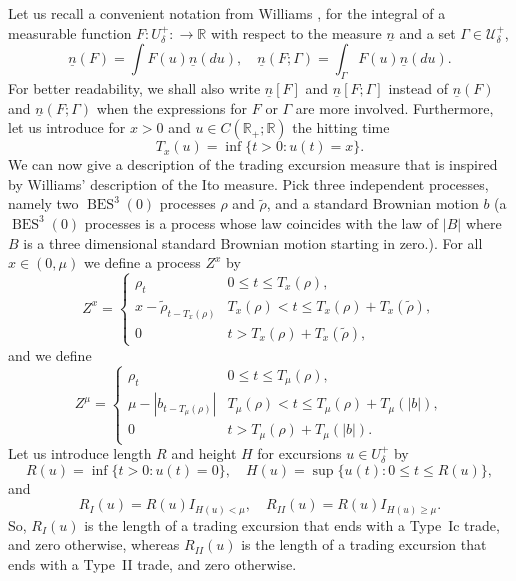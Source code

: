 \documentclass[11pt]{scrartcl}
\DeclareMathOperator{\BES}{BES}
\begin{document}
Let us recall a convenient notation from Williams \cite[Sec.5.0, p.49]{PWM},
for the integral of a measurable function $F:U_\delta^+:\to\mathbb R$ with respect to the
measure $\underline{n}$ and a set $\Gamma\in\mathcal{U}_\delta^+$, 
\begin{equation}
\underline{n}(F)=\int F(u)\underline{n}(du),\quad \underline{n}(F;\Gamma)=\int_\Gamma F(u)\underline{n}(du).
\end{equation}
For better readability, we shall also write $\underline{n}[F]$ and $\underline{n}[F;\Gamma]$ instead of $\underline{n}(F)$ and $\underline{n}(F;\Gamma)$ when the expressions for $F$ or $\Gamma$ are more involved.
Furthermore, let us introduce for $x>0$ and $u\in C(\mathbb{R}_+;\mathbb{R})$
the hitting time 
\begin{equation}
T_x(u)=\inf\{t>0:u(t)=x\}.
\end{equation}
We can now give a description of the trading excursion measure that is
inspired by Williams' description of the Ito measure. Pick three independent
processes, namely two $\BES^3(0)$ processes $\rho$ and $\tilde\rho$, and a
standard Brownian motion $b$ (a $\BES^3(0)$ processes is a process whose law coincides with the law of $|B|$ where $B$ is a three dimensional standard Brownian motion starting in zero.). For all $x\in(0,\mu)$ we define a process $Z^x$
by 
\begin{equation}  \label{Zx}
Z^x=\left\{ 
\begin{array}{ll}
\rho_t & 0\leq t\leq T_x(\rho), \\ 
x-\tilde\rho_{t-T_x(\rho)} & T_x(\rho)<t\leq T_x(\rho)+T_x(\tilde\rho), \\ 
0 & t>T_x(\rho)+T_x(\tilde\rho),\end{array}
\right.
\end{equation}
and we define 
\begin{equation}  \label{Zmu}
Z^\mu=\left\{ 
\begin{array}{ll}
\rho_t & 0\leq t\leq T_\mu(\rho), \\ 
\mu-|b_{t-T_\mu(\rho)}| & T_\mu(\rho)<t\leq T_\mu(\rho)+T_\mu(|b|), \\ 
0 & t> T_\mu(\rho)+T_\mu(|b|).\end{array}
\right.
\end{equation}
Let us introduce length $R$ and height $H$ for excursions $u\in U_\delta^+$ by 
\begin{equation}
R(u)=\inf\{t>0:u(t)=0\},\quad H(u)=\sup\{u(t):0\leq t\leq R(u)\},
\end{equation}
and 
\begin{equation}
R_I(u)=R(u)I_{H(u)<\mu},\quad R_{II}(u)=R(u)I_{H(u)\geq\mu}.
\end{equation}
So, $R_I(u)$ is the length of a trading excursion that ends with a Type~{Ic}
trade, and zero otherwise, whereas $R_{II}(u)$ is the length of a trading
excursion that ends with a Type~{II} trade, and zero otherwise.
\end{document}

